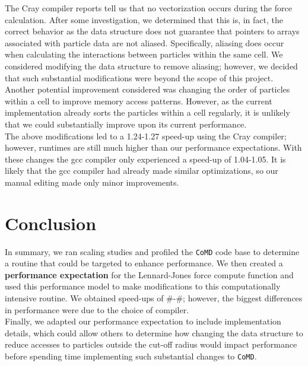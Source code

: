 \documentclass[12pt]{article}
\begin{document}
 The Cray compiler reports tell us that no vectorization
occurs during the force calculation. After some investigation, we
determined that this is, in fact, the correct behavior as the data
structure does not guarantee that pointers to arrays associated with
particle data are not aliased.  Specifically, aliasing does occur when
calculating the interactions between particles within the same
cell. We considered modifying the data structure to remove aliasing;
however, we decided
that such substantial modifications were beyond the scope of this project. \\


 Another potential improvement considered was changing the order of
particles within a cell to improve memory access patterns. However, as the
current implementation already sorts the particles within a cell regularly, it is unlikely 
that we could substantially improve upon its current performance. \\

 The above modifications led to a 1.24-1.27 speed-up using
the Cray compiler; however, runtimes are still much higher than our
performance expectations. With these changes the gcc compiler only
experienced a speed-up of 1.04-1.05. It is likely that the gcc
compiler had already made similar optimizations, so our manual editing
made only minor improvements.


\section{Conclusion}
 In summary, we ran scaling studies and profiled the \texttt{CoMD} code base to 
determine a routine that could be targeted to enhance performance. We then created a 
{\bf performance expectation} for the Lennard-Jones force compute function and used this performance 
model to make modifications to this computationally intensive routine. We obtained speed-ups of
\#-\#; however, the biggest differences in performance were due to the choice of compiler. \\
Finally, we adapted our performance expectation to include implementation details, which could allow 
others to determine how changing the data structure to reduce accesses to particles outside 
the cut-off radius would impact performance before spending time implementing such substantial changes 
to \texttt{CoMD}.
\end{document}
